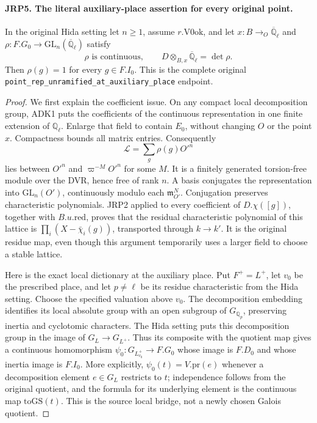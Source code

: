 \documentclass[11pt,a4paper]{article}
\numberwithin{equation}{section}
\theoremstyle{remark}\newtheorem{remark}[theorem]{Remark}
\begin{document}
\paragraph{JRP5. The literal auxiliary-place assertion for every original point.}
\label{claim:JRP5}
In the original Hida setting let \(n\ge1\), assume
\(r.\mathrm{V0ok}\), and let
\(x:B\to_O\overline{\mathbb Q}_\ell\) and
\(\rho:F.G_0\to\mathrm{GL}_n(\overline{\mathbb Q}_\ell)\)
satisfy
\[
 \rho\text{ is continuous},\qquad
                 D\otimes_{B,x}\overline{\mathbb Q}_\ell=\det\rho.
 \tag{JRP.11}
\]
Then \(\rho(g)=1\) for every \(g\in F.I_0\).
This is the complete original
\texttt{point\_\allowbreak rep\_\allowbreak unramified\_\allowbreak at\_\allowbreak auxiliary\_\allowbreak place} endpoint.
\begin{proof}
We first explain the coefficient issue.  On any compact local
decomposition group, ADK1 puts the coefficients of the continuous
representation in one finite extension of \(\mathbb Q_\ell\).
Enlarge that field to contain \(E_0\), without changing \(O\)
or the point \(x\).  Compactness bounds all matrix entries.
Consequently
\[
 \mathcal L=\sum_g\rho(g)O'^n
\]
lies between \(O'^n\) and \(\varpi^{-M}O'^n\) for some
\(M\).  It is a finitely generated torsion-free module over the
DVR, hence free of rank \(n\).  A basis conjugates the
representation into \(\mathrm{GL}_n(O')\), continuously modulo
each \(\mathfrak m_{O'}^N\).  Conjugation preserves characteristic
polynomials.  JRP2 applied to every coefficient of
\(D.\chi([g])\), together with \(B.u.\mathrm{red}\), proves
that the residual characteristic polynomial of this lattice is
\(\prod_i(X-\bar\chi_i(g))\), transported through \(k\to k'\).
It is the original residue map, even though this argument temporarily
uses a larger field to choose a stable lattice.

Here is the exact local dictionary at the auxiliary place.  Put
\(F^+=L^+\), let \(v_0\) be the prescribed place, and let
\(p\ne\ell\) be its residue characteristic from the Hida setting.
Choose the specified valuation above \(v_0\).  The decomposition
embedding identifies its local absolute group with an open subgroup
of \(G_{\mathbb Q_p}\), preserving inertia and cyclotomic
characters.  The Hida setting puts this decomposition group in the
image of \(G_L\to G_{L^+}\).  Thus its composite with the
quotient map gives a continuous homomorphism
\(\psi_0:G_{L^+_{v_0}}\to F.G_0\) whose image is \(F.D_0\)
and whose inertia image is \(F.I_0\).  More explicitly,
\(\psi_0(t)=V.\mathrm{pr}(e)\) whenever a decomposition element
\(e\in G_L\) restricts to \(t\); independence follows from
the original quotient, and the formula for its underlying element
is the continuous map \(\mathrm{toGS}(t)\).  This is the source
local bridge, not a newly chosen Galois quotient.


\end{proof}
\end{document}

